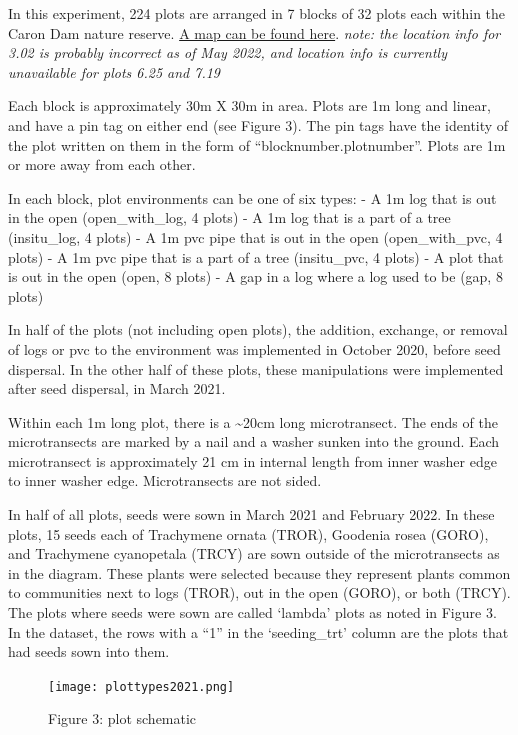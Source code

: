 \documentclass[
]{article}
\begin{document}
In this experiment, 224 plots are arranged in 7 blocks of 32 plots each
within the Caron Dam nature reserve.
\href{https://www.google.com/maps/d/edit?mid=1z6w6tScsCcKSpsdUmoupfOJVaaq16VYk\&usp=sharing}{A
map can be found here}. \emph{note: the location info for 3.02 is
probably incorrect as of May 2022, and location info is currently
unavailable for plots 6.25 and 7.19}

Each block is approximately 30m X 30m in area. Plots are 1m long and
linear, and have a pin tag on either end (see Figure 3). The pin tags
have the identity of the plot written on them in the form of
``blocknumber.plotnumber''. Plots are 1m or more away from each other.

In each block, plot environments can be one of six types: - A 1m log
that is out in the open (open\_with\_log, 4 plots) - A 1m log that is a
part of a tree (insitu\_log, 4 plots) - A 1m pvc pipe that is out in the
open (open\_with\_pvc, 4 plots) - A 1m pvc pipe that is a part of a tree
(insitu\_pvc, 4 plots) - A plot that is out in the open (open, 8 plots)
- A gap in a log where a log used to be (gap, 8 plots)

In half of the plots (not including open plots), the addition, exchange,
or removal of logs or pvc to the environment was implemented in October
2020, before seed dispersal. In the other half of these plots, these
manipulations were implemented after seed dispersal, in March 2021.

Within each 1m long plot, there is a \textasciitilde20cm long
microtransect. The ends of the microtransects are marked by a nail and a
washer sunken into the ground. Each microtransect is approximately 21 cm
in internal length from inner washer edge to inner washer edge.
Microtransects are not sided.

In half of all plots, seeds were sown in March 2021 and February 2022.
In these plots, 15 seeds each of Trachymene ornata (TROR), Goodenia
rosea (GORO), and Trachymene cyanopetala (TRCY) are sown outside of the
microtransects as in the diagram. These plants were selected because
they represent plants common to communities next to logs (TROR), out in
the open (GORO), or both (TRCY). The plots where seeds were sown are
called `lambda' plots as noted in Figure 3. In the dataset, the rows
with a ``1'' in the `seeding\_trt' column are the plots that had seeds
sown into them.

\begin{figure}
\centering
\texttt{[image: plottypes2021.png]}
\caption{Figure 3: plot schematic}
\end{figure}
\end{document}
